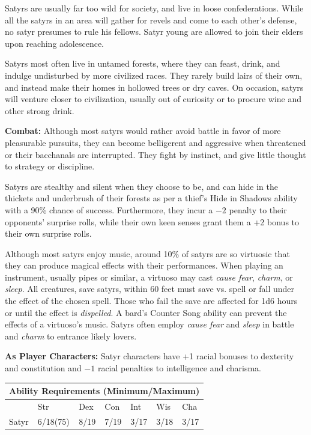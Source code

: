 \begin{multicols}{2}
Satyrs are usually far too wild for society, and live in loose confederations. While all the satyrs in an area will gather for revels and come to each other's defense, no satyr presumes to rule his fellows. Satyr young are allowed to join their elders upon reaching adolescence.

Satyrs most often live in untamed forests, where they can feast, drink, and indulge undisturbed by more civilized races. They rarely build lairs of their own, and instead make their homes in hollowed trees or dry caves. On occasion, satyrs will venture closer to civilization, usually out of curiosity or to procure wine and other strong drink.

\textbf{Combat:} Although most satyrs would rather avoid battle in favor of more pleasurable pursuits, they can become belligerent and aggressive when threatened or their bacchanals are interrupted. They fight by instinct, and give little thought to strategy or discipline.

Satyrs are stealthy and silent when they choose to be, and can hide in the thickets and underbrush of their forests as per a thief's Hide in Shadows ability with a 90\% chance of success. Furthermore, they incur a $-2$ penalty to their opponents' surprise rolls, while their own keen senses grant them a +2 bonus to their own surprise rolls.

Although most satyrs enjoy music, around 10\% of satyrs are so virtuosic that they can produce magical effects with their performances. When playing an instrument, usually pipes or similar, a virtuoso may cast \textit{cause fear}, \textit{charm}, or \textit{sleep}. All creatures, save satyrs, within 60 feet must save vs. spell or fall under the effect of the chosen spell. Those who fail the save are affected for 1d6 hours or until the effect is \textit{dispelled}. A bard's Counter Song ability can prevent the effects of a virtuoso's music. Satyrs often employ \textit{cause fear} and \textit{sleep} in battle and \textit{charm} to entrance likely lovers.

\textbf{As Player Characters:} Satyr characters have +1 racial bonuses to dexterity and constitution and $-1$ racial penalties to intelligence and charisma.

\noindent \begin{minipage}{\columnwidth}

\noindent \begin{tabular}{|p{}|p{}|p{}|p{}|p{}|p{}|p{}|}
\multicolumn{7}{c}{Ability Requirements (Minimum/Maximum)} \\
\hline
	& Str	& Dex	& Con	& Int	& Wis	& Cha	\\
\hline\hline
\rowcolor[gray]{.9}Satyr	& 6/18(75)	& 8/19	& 7/19	& 3/17	& 3/18	& 3/17	\\
\hline
\end{tabular}


\end{minipage}
\end{multicols}
